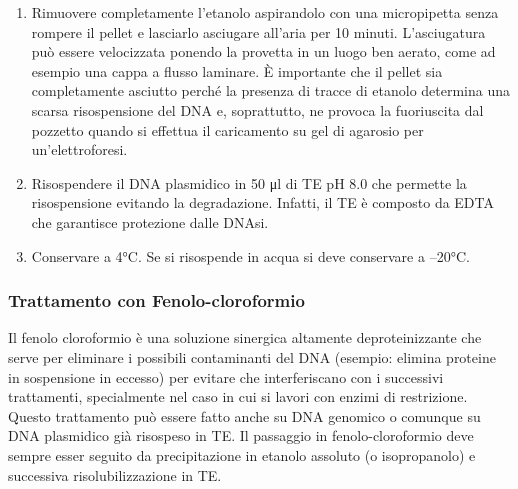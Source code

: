 \begin{enumerate}
  \item Rimuovere completamente l’etanolo aspirandolo con una micropipetta senza rompere il pellet e lasciarlo asciugare
	all’aria per 10 minuti. L’asciugatura può essere velocizzata ponendo la provetta in un luogo ben aerato,
	come ad esempio una cappa a flusso laminare.
	\`E importante che il pellet sia completamente asciutto perché la presenza di tracce di etanolo determina una scarsa
	risospensione del DNA e, soprattutto, ne provoca la fuoriuscita dal pozzetto quando si effettua il caricamento su gel di
	agarosio per un’elettroforesi.

  \item Risospendere il DNA plasmidico in 50 μl di TE pH 8.0 che permette la risospensione evitando la degradazione.
	Infatti, il TE è composto da EDTA che garantisce protezione dalle DNAsi.

  \item Conservare a 4°C. Se si risospende in acqua si deve conservare a –20°C.

\end{enumerate}

\subsubsection{Trattamento con Fenolo-cloroformio}

Il fenolo cloroformio è una soluzione sinergica altamente deproteinizzante che serve per eliminare i possibili
contaminanti del DNA (esempio: elimina proteine in sospensione in eccesso) per evitare che interferiscano con i
successivi trattamenti, specialmente nel caso in cui si lavori con enzimi di restrizione.
Questo trattamento può essere fatto anche su DNA genomico o comunque su DNA plasmidico già risospeso in TE.
Il passaggio in fenolo-cloroformio deve sempre esser seguito da precipitazione in etanolo assoluto (o isopropanolo)
e successiva risolubilizzazione in TE.

